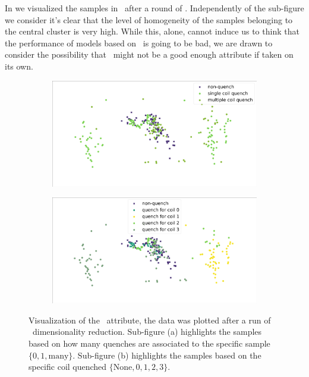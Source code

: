 In  we visualized the samples in \bn\ after a round of \pca. Independently of the sub-figure we consider it's clear that the level of
homogeneity of the samples belonging to the central cluster is very high. While this, alone, cannot
induce us to think that the performance of models based on \bn\ is going to be bad, we are drawn to
consider the possibility that \bn\ might not be a good enough attribute if taken on its own.
\begin{figure}[!ht]
	\centering
	\begin{subfigure}{0.8\linewidth}
		\centering
		\includegraphics[width=\linewidth]{img/quench_dist_qlp/single_vs_multiple_Bn.png}
		\subcaption{}
	\end{subfigure}
	\begin{subfigure}{0.8\linewidth}
		\centering
		\includegraphics[width=\linewidth]{img/quench_dist_qlp_bn.png}
		\subcaption{}
	\end{subfigure}
	\caption{Visualization of the \bn\ attribute, the data was plotted after a run of \pca\
		dimensionality reduction. Sub-figure (a) highlights the samples based on how many quenches
		are associated to the specific sample $\{0, 1, \text{many}\}$. Sub-figure (b) highlights the
		samples based on the specific coil quenched $\{\text{None}, 0, 1, 2, 3\}$.}
	\label{fig:bn-coilq-dist}
\end{figure}

